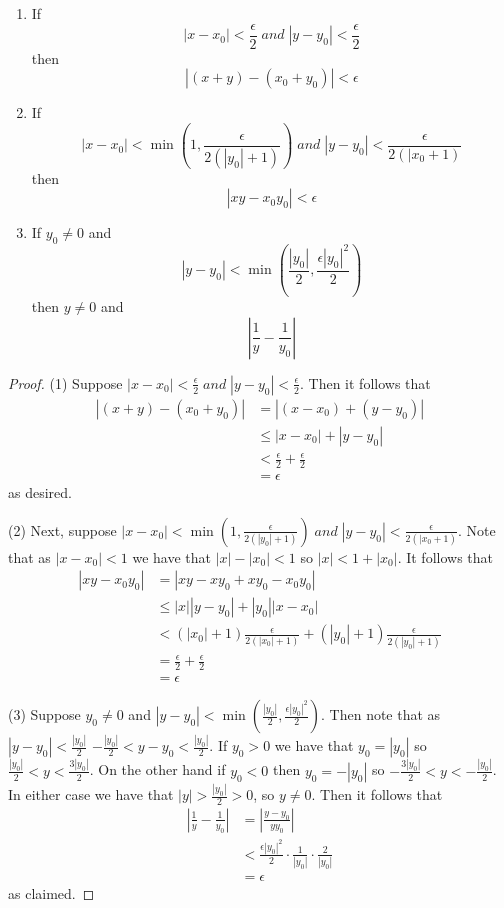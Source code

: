 \begin{lem}
    \leavevmode
    \begin{enumerate}
        \item If $$|x-x_0| < \frac{\epsilon}{2}\;and\;|y-y_0| < \frac{\epsilon}{2}$$
            then $$|(x+y) - (x_0+y_0)| < \epsilon$$
        \item If $$|x-x_0| < \min\left(1,\frac{\epsilon}{2(|y_0|+1)}\right)\;and\;|y-y_0| < \frac{\epsilon}{2(|x_0+1)}$$
            then $$|xy-x_0y_0| < \epsilon$$
        \item If $y_0 \neq 0$ and $$|y-y_0| < \min\left(\frac{|y_0|}{2},\frac{\epsilon|y_0|^2}{2}\right)$$
            then $y\neq 0$ and $$\left|\frac{1}{y} - \frac{1}{y_0}\right|$$
    \end{enumerate}
\end{lem}
\begin{proof}
    (1) Suppose $|x-x_0| < \frac{\epsilon}{2}\;and\;|y-y_0| < \frac{\epsilon}{2}$. Then it follows that \begin{align*}
        |(x+y) - (x_0+y_0)| &= |(x-x_0)+(y-y_0)| \\
        &\leq |x-x_0| + |y-y_0| \\
        &< \frac{\epsilon}{2} + \frac{\epsilon}{2} \\
        &= \epsilon
    \end{align*}
    as desired.


    (2) Next, suppose $|x-x_0| < \min\left(1,\frac{\epsilon}{2(|y_0|+1)}\right)\;and\;|y-y_0| < \frac{\epsilon}{2(|x_0+1)}$. Note that as $|x-x_0| < 1$ we have that $|x| - |x_0| < 1$ so $|x| < 1+|x_0|$. It follows that \begin{align*}
        |xy-x_0y_0| &= |xy-xy_0+xy_0-x_0y_0| \\
        &\leq |x||y-y_0| + |y_0||x-x_0| \\
        &< (|x_0|+1)\frac{\epsilon}{2(|x_0|+1)} + (|y_0| + 1)\frac{\epsilon}{2(|y_0|+1)} \\
        &= \frac{\epsilon}{2} + \frac{\epsilon}{2} \\
        &= \epsilon
    \end{align*}


    (3) Suppose $y_0 \neq 0$ and $|y-y_0| < \min\left(\frac{|y_0|}{2},\frac{\epsilon|y_0|^2}{2}\right)$. Then note that as $|y-y_0| < \frac{|y_0|}{2}$ $-\frac{|y_0|}{2} < y-y_0 < \frac{|y_0|}{2}$. If $y_0 > 0$ we have that $y_0 = |y_0|$ so $\frac{|y_0|}{2} < y < \frac{3|y_0|}{2}$. On the other hand if $y_0 < 0$ then $y_0 = -|y_0|$ so $-\frac{3|y_0|}{2} < y < -\frac{|y_0|}{2}$. In either case we have that $|y| > \frac{|y_0|}{2} > 0$, so $y \neq 0$. Then it follows that \begin{align*}
        \left|\frac{1}{y} - \frac{1}{y_0}\right| &= \left|\frac{y - y_0}{yy_0}\right| \\
        &< \frac{\epsilon|y_0|^2}{2}\cdot \frac{1}{|y_0|}\cdot \frac{2}{|y_0|} \\
        &= \epsilon
    \end{align*}
    as claimed.
\end{proof}


